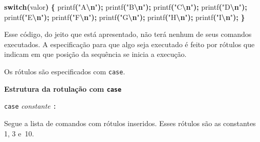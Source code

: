 \documentclass[
  11pt,
  a4paper,
]{scrbook}
\newenvironment{Shaded}{\begin{snugshade}}{\end{snugshade}}
\newcommand{\ControlFlowTok}[1]{\textcolor[rgb]{0.13,0.29,0.53}{\textbf{#1}}}
\newcommand{\NormalTok}[1]{#1}
\newcommand{\OperatorTok}[1]{\textcolor[rgb]{0.81,0.36,0.00}{\textbf{#1}}}
\newcommand{\SpecialCharTok}[1]{\textcolor[rgb]{0.81,0.36,0.00}{\textbf{#1}}}
\newcommand{\StringTok}[1]{\textcolor[rgb]{0.31,0.60,0.02}{#1}}
\begin{document}
\begin{Shaded}
\begin{Highlighting}[]
\ControlFlowTok{switch}\OperatorTok{(}\NormalTok{valor}\OperatorTok{)} \OperatorTok{\{}
\NormalTok{    printf}\OperatorTok{(}\StringTok{"A}\SpecialCharTok{\textbackslash{}n}\StringTok{"}\OperatorTok{);}
\NormalTok{    printf}\OperatorTok{(}\StringTok{"B}\SpecialCharTok{\textbackslash{}n}\StringTok{"}\OperatorTok{);}
\NormalTok{    printf}\OperatorTok{(}\StringTok{"C}\SpecialCharTok{\textbackslash{}n}\StringTok{"}\OperatorTok{);}
\NormalTok{    printf}\OperatorTok{(}\StringTok{"D}\SpecialCharTok{\textbackslash{}n}\StringTok{"}\OperatorTok{);}
\NormalTok{    printf}\OperatorTok{(}\StringTok{"E}\SpecialCharTok{\textbackslash{}n}\StringTok{"}\OperatorTok{);}
\NormalTok{    printf}\OperatorTok{(}\StringTok{"F}\SpecialCharTok{\textbackslash{}n}\StringTok{"}\OperatorTok{);}
\NormalTok{    printf}\OperatorTok{(}\StringTok{"G}\SpecialCharTok{\textbackslash{}n}\StringTok{"}\OperatorTok{);}
\NormalTok{    printf}\OperatorTok{(}\StringTok{"H}\SpecialCharTok{\textbackslash{}n}\StringTok{"}\OperatorTok{);}
\NormalTok{    printf}\OperatorTok{(}\StringTok{"I}\SpecialCharTok{\textbackslash{}n}\StringTok{"}\OperatorTok{);}
\OperatorTok{\}}
\end{Highlighting}
\end{Shaded}

Esse código, do jeito que está apresentado, não terá nenhum de seus
comandos executados. A especificação para que algo seja executado é
feito por rótulos que indicam em que posição da sequência se inicia a
execução.

Os rótulos são especificados com \texttt{case}.

\begin{tcolorbox}[enhanced jigsaw, colback=white, arc=.35mm, colframe=quarto-callout-color-frame, toprule=.15mm, leftrule=.75mm, left=2mm, rightrule=.15mm, bottomrule=.15mm, opacityback=0, breakable]

\vspace{-3mm}\textbf{Estrutura da rotulação com \texttt{case}}\vspace{3mm}

\texttt{case} \emph{constante} \texttt{:}

\end{tcolorbox}

Segue a lista de comandos com rótulos inseridos. Esses rótulos são as
constantes 1, 3 e~10.
\end{document}
